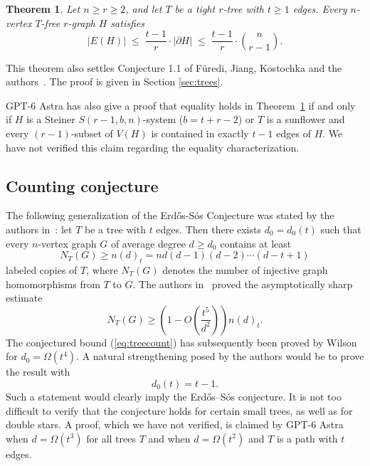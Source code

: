 \documentclass[11pt]{article}
\newtheorem{theorem}{Theorem}[section]
\theoremstyle{remark}
\numberwithin{equation}{section}
\newcommand{\sh}{\partial}
\begin{document}
	\begin{theorem}\label{thm:main}
		Let $n \ge r\ge 2$, and let $T$ be a tight $r$-tree with $t\ge1$ edges.
		Every $n$-vertex $T$-free $r$-graph $H$ satisfies
		\begin{equation}\label{eq:main-shadow}
			|E(H)| \; \le \; \frac{t-1}{r} \cdot |\sh H| \; \le \; \frac{t-1}{r} \cdot \binom{n}{r-1} .
		\end{equation}
		
	\end{theorem}
	
	
	This theorem also settles Conjecture 1.1 of  F\"uredi, Jiang, Kostochka and the authors~\cite{FJKMVpaths}. The proof is given in Section \ref{sec:trees}. 
	
	GPT-6 Astra has also give a proof that equality holds in Theorem~\ref{thm:main} if and only if $H$ is a Steiner $S(r-1,b,n)$-system ($b=t+r-2$) or $T$ is a sunflower and every $(r - 1)$-subset of $V(H)$ is contained in exactly $t - 1$ edges of $H$. We have not verified this claim regarding the equality characterization. 
	
	\subsection{Counting conjecture}
	
	The following generalization of the Erd\H{o}s-S\'{o}s Conjecture was stated by the authors in~\cite{MubayiV2016}: let $T$ be a tree with $t$ edges. Then there exists $d_0=d_0(t)$ such that every $n$-vertex graph $G$ of average degree $d\geq d_0$ contains at least \begin{equation}\label{eq:treecount} N_T(G) \geq n(d)_t = n d(d-1)(d-2)\cdots(d-t+1) \end{equation} labeled copies of $T$, where $N_T(G)$ denotes the number of injective graph homomorphisms from $T$ to $G$. 
	The authors in~\cite{MubayiV2016} proved the asymptotically sharp estimate \begin{equation} 
		N_T(G) \geq \left(1-O\left(\frac{t^5}{d^2}\right)\right)n(d)_t. \end{equation} 
	The conjectured bound (\ref{eq:treecount}) has subsequently been proved by Wilson~\cite{Wilson2025} for $d_0=\Omega(t^4)$. A natural strengthening posed by the authors would be to prove the result with \begin{equation} d_0(t) = t - 1. \end{equation} Such a statement would clearly imply the Erd\H{o}s--S\'os conjecture.  It is not too difficult to verify that the conjecture holds for certain small trees, as well as for double stars.
	A proof, which we have not verified, is claimed by GPT-6 Astra when $d=\Omega(t^3)$ for all trees $T$ and when $d=\Omega(t^2)$ and $T$ is a  path with $t$ edges. 
	
\end{document}
